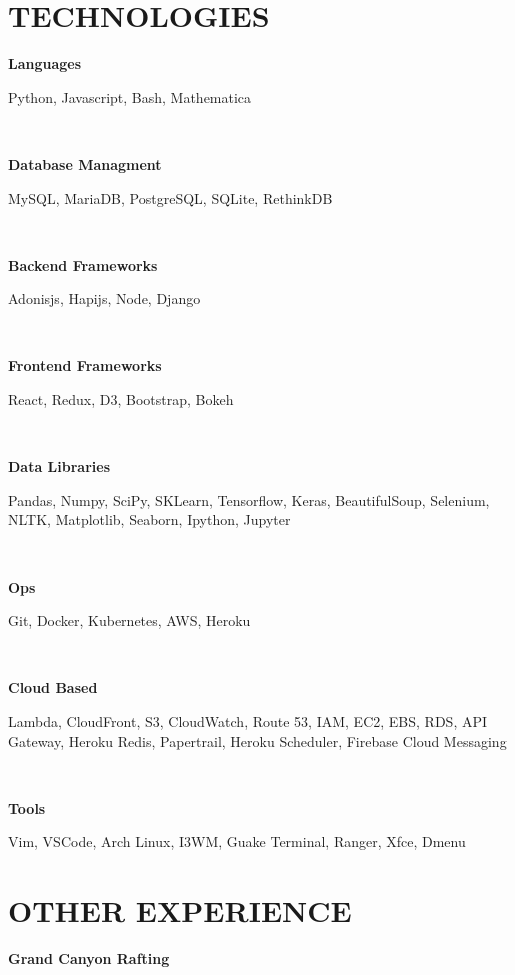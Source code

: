 \documentclass[12pt]{resume}
\begin{document}
    \hspace{10mm}
    \begin{minipage}[t]{0.48\textwidth}
        {\section* {TECHNOLOGIES}}
        { \par \bf Languages }
        { \par Python, Javascript, Bash, Mathematica}\\
        { \par \bf Database Managment }
        { \par MySQL, MariaDB, PostgreSQL, SQLite, RethinkDB}\\
        { \par \bf Backend Frameworks }
        { \par Adonisjs, Hapijs, Node, Django}\\
        { \par \bf Frontend Frameworks}
        { \par React, Redux, D3, Bootstrap, Bokeh}\\
        { \par \bf Data Libraries}
        { \par Pandas, Numpy, SciPy, SKLearn, Tensorflow, Keras, 
        BeautifulSoup, Selenium, NLTK, Matplotlib, Seaborn, Ipython, Jupyter}\\
        { \par \bf *Ops}
        { \par Git, Docker, Kubernetes, AWS, Heroku}\\
        { \par \bf Cloud Based}
        { \par Lambda, CloudFront, S3, CloudWatch, Route 53, IAM, EC2, EBS,
        RDS, API Gateway, Heroku Redis, Papertrail, Heroku Scheduler, Firebase
        Cloud Messaging}\\
        { \par \bf Tools }
        { \par Vim, VSCode, Arch Linux, I3WM, Guake Terminal, Ranger, Xfce,
        Dmenu}
        {\section* {OTHER EXPERIENCE}}
            {\par \bf Grand Canyon Rafting}
            \vspace{.05mm}
            \begin{itemize}

\end{itemize}
\end{minipage}
\end{document}
